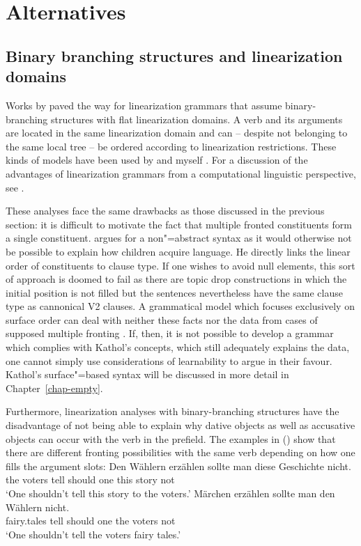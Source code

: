 \chapter{Alternatives}
\label{chap-alternatives}%





\section{Binary branching structures and linearization domains}

Works by \citet{Reape94a} paved the way for linearization grammars that assume binary-branching
structures with flat linearization domains. A verb and its arguments are located in the same linearization
domain and can -- despite not belonging to the same local tree -- be ordered according to linearization 
restrictions. These kinds of models have been used by \citet{Kathol95a,Kathol2000a} and myself \citep{Mueller95c,Mueller99a,Mueller2002b}.
For a discussion of the advantages of linearization grammars from a computational linguistic perspective, see .

These analyses face the same drawbacks as those discussed in the previous section:
it is difficult to motivate the fact that multiple fronted constituents form a single 
constituent. \citet{Kathol97a} argues for a non"=abstract syntax as it would otherwise
not be possible to explain how children acquire language. He directly links the linear order of
constituents to clause type. If one wishes to avoid null elements, this sort of approach is doomed
to fail as there are topic drop constructions in which the initial position is not filled but the
sentences nevertheless have the same clause type as cannonical V2 clauses.  A  grammatical model which focuses exclusively 
on surface order can deal with neither these facts nor the data from cases of supposed multiple fronting
\citep{Mueller2004e}. If, then, it is  not possible to develop a grammar which complies with Kathol's concepts, which
still adequately explains the data, one cannot simply use considerations of learnability to argue in
their favour. Kathol's surface"=based syntax will be discussed in more detail in Chapter~\ref{chap-empty}.

Furthermore, linearization analyses with binary-branching structures have the disadvantage of
not being able to explain why dative objects as well as accusative objects can occur with the verb
in the prefield. The examples in () show that there are different fronting possibilities with the same verb 
depending on how one fills the argument slots:
\eal
\label{bsp-acc-dat-pvp}
\ex 
\gll Den Wählern erzählen sollte man diese Geschichte nicht.\\
	 the voters tell should one this story not\\
\glt `One shouldn't tell this story to the voters.'
\ex 
\gll Märchen erzählen sollte man den Wählern nicht.\\
	 fairy.tales tell should one the voters not\\
\glt `One shouldn't tell the voters fairy tales.'
\zl

